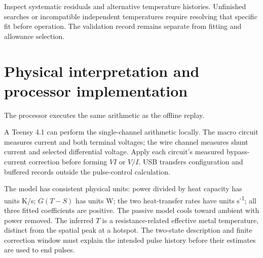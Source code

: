 \documentclass[11pt,letterpaper]{article}
\begin{document}
Inspect systematic residuals and alternative temperature histories. Unfinished searches or incompatible independent temperatures require resolving that specific fit before operation. The validation record remains separate from fitting and allowance selection.

\section{Physical interpretation and processor implementation}

The processor executes the same arithmetic as the offline replay.

A Teensy 4.1 can perform the single-channel arithmetic locally. The macro circuit measures current and both terminal voltages; the wire channel measures shunt current and selected differential voltage. Apply each circuit's measured bypass-current correction before forming \(VI\) or \(V/I\). USB transfers configuration and buffered records outside the pulse-control calculation.

The model has consistent physical units: power divided by heat capacity has units K/s; \(G(T-S)\) has units W; the two heat-transfer rates have units s\textsuperscript{-1}; all three fitted coefficients are positive. The passive model cools toward ambient with power removed. The inferred \(T\) is a resistance-related effective metal temperature, distinct from the spatial peak at a hotspot. The two-state description and finite correction window must explain the intended pulse history before their estimates are used to end pulses.
\end{document}
